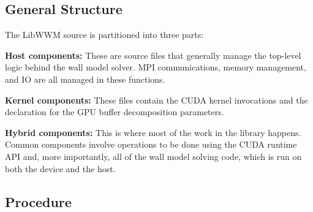 \documentclass[10pt]{article}
\newcommand{\libname}{LibWWM}
\renewcommand{\sec}[1]{\subsection*{#1}}
\begin{document}
	\sec{General Structure}

	The \libname{} source is partitioned into three parts:

	\ilist
	{
		\item \textbf{Host components:} These are source files that generally manage the top-level logic behind the wall model solver. MPI communications, memory management, and IO are
			all managed in these functions.
		\item \textbf{Kernel components:} These files contain the CUDA kernel invocations and the declaration for the GPU buffer decomposition parameters.
		\item \textbf{Hybrid components:} This is where most of the work in the library happens. Common components involve operations to be done using the CUDA runtime API and,
			more importantly, all of the wall model solving code, which is run on both the device and the host.
	}

	\sec{Procedure}
\end{document}
